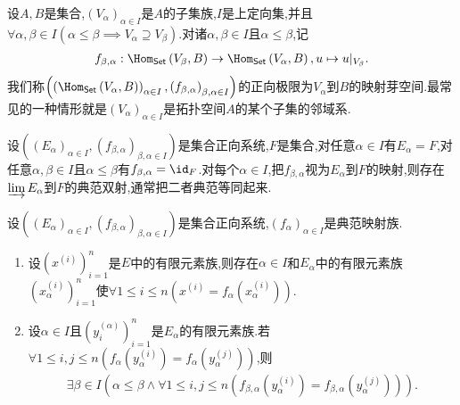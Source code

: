 \begin{example}{}{}
	设$A,B$是集合,$\left(V_{\alpha}\right)_{\alpha\in I}$是$A$的子集族,$I$是上定向集,并且$\forall\alpha,\beta\in I\left(\alpha\leq\beta\implies V_{\alpha}\supseteq V_{\beta}\right)$.对诸$\alpha,\beta\in I$且$\alpha\leq\beta$,记
	\begin{align*}
		f_{\beta,\alpha}:\Hom_{\mathsf{Set}}\left(V_{\beta},B\right)\to\Hom_{\mathsf{Set}}\left(V_{\alpha},B\right),u\mapsto u|_{V_{\beta}}.
	\end{align*}
	我们称$\left(\left(\Hom_{\mathsf{Set}}\left(V_{\alpha},B\right)\right)_{\alpha\in I},\left(f_{\beta,\alpha}\right)_{\beta,\alpha\in I}\right)$的正向极限为$V_{\alpha}$到$B$的映射芽空间.最常见的一种情形就是$\left(V_{\alpha}\right)_{\alpha\in I}$是拓扑空间$A$的某个子集的邻域系.
\end{example}

\begin{example}{}{}
	设$\left(\left(E_{\alpha}\right)_{\alpha\in I},\left(f_{\beta,\alpha}\right)_{\beta,\alpha\in I}\right)$是集合正向系统,$F$是集合,对任意$\alpha\in I$有$E_{\alpha}=F$,对任意$\alpha,\beta\in I$且$\alpha\leq\beta$有$f_{\beta,\alpha}=\id_{F}$.对每个$\alpha\in I$,把$f_{\beta,\alpha}$视为$E_{\alpha}$到$F$的映射,则存在$\varinjlim E_{\alpha}$到$F$的典范双射,通常把二者典范等同起来.
\end{example}

\begin{lemma}{}{}
	设$\left(\left(E_{\alpha}\right)_{\alpha\in I},\left(f_{\beta,\alpha}\right)_{\beta,\alpha\in I}\right)$是集合正向系统,$\left(f_{\alpha}\right)_{\alpha\in I}$是典范映射族.
	\begin{enumerate}
		\item 设$\left(x^{\left(i\right)}\right)_{i=1}^{n}$是$E$中的有限元素族,则存在$\alpha\in I$和$E_{\alpha}$中的有限元素族$\left(x_{\alpha}^{\left(i\right)}\right)_{i=1}^{n}$使$\forall 1\leq i\leq n \left(x^{\left(i\right)}=f_{\alpha}\left(x_{\alpha}^{\left(i\right)}\right)\right)$.
		\item 设$\alpha\in I$且$\left(y_{i}^{\left(\alpha\right)}\right)_{i=1}^{n}$是$E_{\alpha}$的有限元素族.若$\forall 1\leq i,j\leq n\left(f_{\alpha}\left(y_{\alpha}^{\left(i\right)}\right)=f_{\alpha}\left(y_{\alpha}^{\left(j\right)}\right)\right)$,则
		\begin{align*}
			\exists\beta\in I\left(\alpha\leq\beta\wedge\forall 1\leq i,j\leq n\left(f_{\beta,\alpha}\left(y_{\alpha}^{\left(i\right)}\right)=f_{\beta,\alpha}\left(y_{\alpha}^{\left(j\right)}\right)\right)\right).
		\end{align*}
	\end{enumerate}
\end{lemma}



